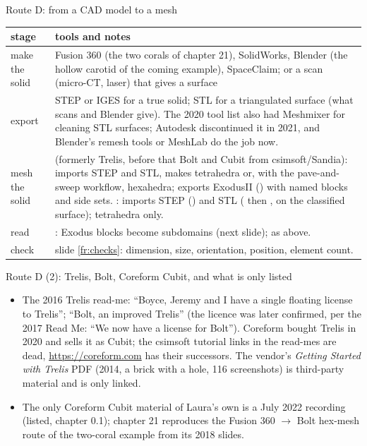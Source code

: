 \documentclass[aspectratio=169,11pt]{beamer}
\begin{document}
\begin{frame}{Route D: from a CAD model to a mesh}
\label{fr:cad}
\footnotesize
\begin{tabular}{@{}L{0.22\textwidth}L{0.70\textwidth}@{}}
\toprule
stage & tools and notes \\
\midrule
make the solid & Fusion 360 (the two corals of chapter 21), SolidWorks, Blender (the hollow carotid of the coming example), SpaceClaim; or a scan (micro-CT, laser) that gives a surface \\
export & STEP or IGES for a true solid; STL for a triangulated surface (what scans and Blender give). The 2020 tool list also had Meshmixer for cleaning STL surfaces; Autodesk discontinued it in 2021, and Blender's remesh tools or MeshLab do the job now. \\
mesh the solid &  (formerly Trelis, before that Bolt and Cubit from csimsoft/Sandia): imports STEP and STL, makes tetrahedra or, with the pave-and-sweep workflow, hexahedra; exports ExodusII () with named blocks and side sets. : imports STEP () and STL ( then ,  on the classified surface); tetrahedra only. \\
read & : Exodus blocks become subdomains (next slide);  as above. \\
check & slide \ref{fr:checks}: dimension, size, orientation, position, element count. \\
\bottomrule
\end{tabular}

\end{frame}

\begin{frame}{Route D (2): Trelis, Bolt, Coreform Cubit, and what is only listed}
\label{fr:cad2}
\footnotesize
\begin{itemize}
  \item The 2016 Trelis read-me: ``Boyce, Jeremy and I have a single floating license to Trelis''; ``Bolt, an improved Trelis'' (the licence was later confirmed, per the 2017 Read Me: ``We now have a license for Bolt''). Coreform bought Trelis in 2020 and sells it as Cubit; the csimsoft tutorial links in the read-mes are dead, \url{https://coreform.com} has their successors. The vendor's \emph{Getting Started with Trelis} PDF (2014, a brick with a hole, 116 screenshots) is third-party material and is only linked.
  \item The only Coreform Cubit material of Laura's own is a July 2022 recording (listed, chapter 0.1); chapter 21 reproduces the Fusion 360 $\to$ Bolt hex-mesh route of the two-coral example from its 2018 slides.
\end{itemize}
\end{frame}
\end{document}

